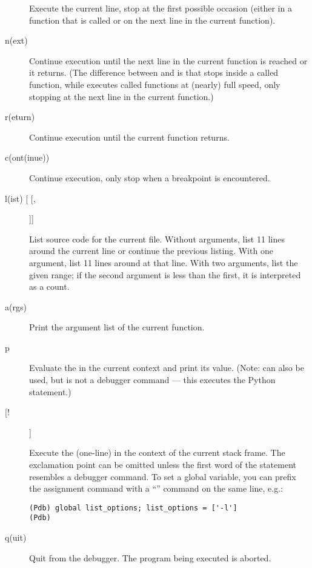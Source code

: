 \begin{description}
Execute the current line, stop at the first possible occasion
(either in a function that is called or on the next line in the
current function).

\item[n(ext)]

Continue execution until the next line in the current function
is reached or it returns.  (The difference between  and
 is that  stops inside a called function, while
 executes called functions at (nearly) full speed, only
stopping at the next line in the current function.)

\item[r(eturn)]

Continue execution until the current function returns.

\item[c(ont(inue))]

Continue execution, only stop when a breakpoint is encountered.

\item[l(ist) [\var{first} [, \var{last}]]]

List source code for the current file.  Without arguments, list 11
lines around the current line or continue the previous listing.  With
one argument, list 11 lines around at that line.  With two arguments,
list the given range; if the second argument is less than the first,
it is interpreted as a count.

\item[a(rgs)]

Print the argument list of the current function.

\item[p \var{expression}]

Evaluate the  in the current context and print its
value.  (Note:  can also be used, but is not a debugger
command --- this executes the Python  statement.)

\item[[!] ]

Execute the (one-line)  in the context of
the current stack frame.
The exclamation point can be omitted unless the first word
of the statement resembles a debugger command.
To set a global variable, you can prefix the assignment
command with a ``'' command on the same line, e.g.:
\begin{verbatim}
(Pdb) global list_options; list_options = ['-l']
(Pdb)
\end{verbatim}

\item[q(uit)]

Quit from the debugger.
The program being executed is aborted.

\end{description}

